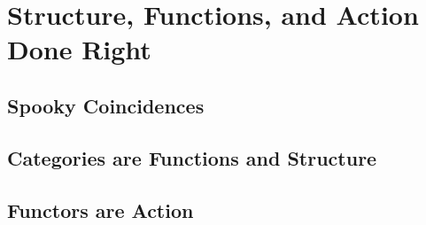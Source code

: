 \chapter{Structure, Functions, and Action Done Right}

\section{Spooky Coincidences}

\section{Categories are Functions and Structure}

\section{Functors are Action}

